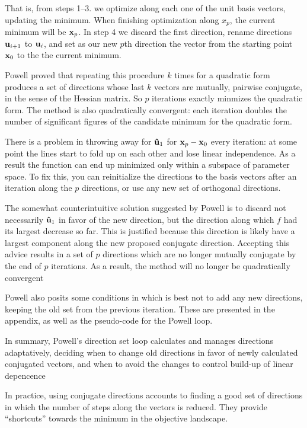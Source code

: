 That is, from steps 1--3. we optimize along each one of the unit basis vectors, updating the minimum. When finishing optimization along ${x}_p$, the current minimum will be $\vb{x}_p$. In step 4 we discard the first direction, rename directions $\vb{u}_{i+1}$ to $\vb{u}_i$, and set as our new $p$th direction the vector from the starting point $\vb{x}_0$ to the the current minimum.

Powell proved that repeating this procedure $k$ times for a quadratic form produces a set of directions whose last $k$ vectors are mutually, pairwise conjugate, in the sense of the Hessian matrix. So $p$ iterations exactly minmizes the quadratic form. The method is also quadratically convergent: each iteration doubles the number of significant figures of the candidate minimum for the quadratic form.

There is a problem in throwing away  for $\vu{u}_1$ for $\vb{x}_p - \vb{x}_0$ every iteration: at some point the lines start to fold up on each other and lose linear independence. As a result the function can end up minimized only within a subspace of parameter space. To fix this, you can reinitialize the directions to the basis vectors after an iteration along the $p$ directions, or use any new set of orthogonal directions.

The somewhat counterintuitive solution suggested by Powell is to discard not necessarily $\vu{u}_1$ in favor of the new direction, but the direction along which $f$ had its largest decrease so far. This is justified because this direction is likely have a largest component along the new proposed conjugate direction. Accepting this advice results in a set of $p$ directions which are no longer mutually conjugate by the end of $p$ iterations. As a result, the method will no longer be quadratically convergent

Powell also posits some conditions in which is best not to add any new directions, keeping the old set from the previous iteration. These are presented in the appendix, as well as the pseudo-code for the Powell loop.

In summary, Powell's direction set loop calculates and manages directions adaptatively, deciding when to change old directions in favor of newly calculated conjugated vectors, and when to avoid the changes to control build-up of linear depencence

In practice, using conjugate directions accounts to finding a good set of directions in which the number of steps along the vectors is reduced. They provide ``shortcuts'' towards the minimum in the objective landscape.
